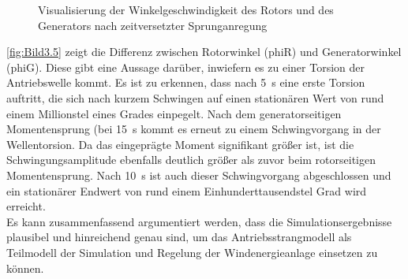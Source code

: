 \begin{figure}[H]
   \centering
   \caption[Winkelgeschwindigkeiten Antriebsstrang]{Visualisierung der Winkelgeschwindigkeit des Rotors und des Generators nach zeitversetzter Sprunganregung}
   \label{fig:Bild3.4}
\end{figure}

\autoref{fig:Bild3.5} zeigt die Differenz zwischen Rotorwinkel (\acs{phiR}) und Generatorwinkel (\ac{phiG}). Diese gibt eine Aussage darüber, inwiefern es zu einer Torsion der Antriebswelle kommt. Es ist zu erkennen, dass nach \SI{5}{s} eine erste Torsion auftritt, die sich nach kurzem Schwingen auf einen stationären Wert von rund einem Millionstel eines Grades einpegelt. Nach dem generatorseitigen Momentensprung (bei \SI{15}{s} kommt es erneut zu einem Schwingvorgang in der Wellentorsion. Da das eingeprägte Moment signifikant größer ist, ist die Schwingungsamplitude ebenfalls deutlich größer als zuvor beim rotorseitigen Momentensprung. Nach \ca \SI{10}{s} ist auch dieser Schwingvorgang abgeschlossen und ein stationärer Endwert von rund einem Einhunderttausendstel Grad wird erreicht. \\
Es kann zusammenfassend argumentiert werden, dass die Simulationsergebnisse plausibel und hinreichend genau sind, um das Antriebsstrangmodell als Teilmodell der Simulation und Regelung der Windenergieanlage einsetzen zu können.

